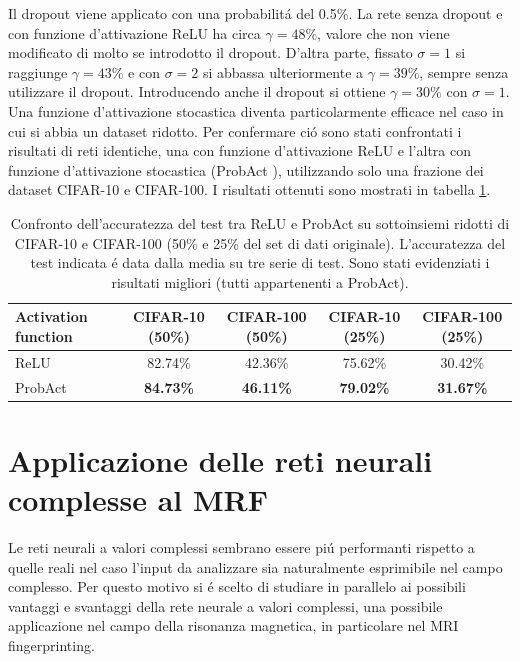 \documentclass[a4paper,10pt]{article}
\begin{document}
  
  Il dropout viene applicato con una probabilit\'a del 0.5\%. La rete senza dropout e con funzione d'attivazione ReLU ha circa $\gamma = 48\%$, valore che non viene modificato di molto se introdotto il dropout. D'altra parte, fissato $\sigma = 1$ si raggiunge $\gamma = 43\%$ e con $\sigma = 2$ si abbassa ulteriormente a $\gamma = 39\%$, sempre senza utilizzare il dropout. Introducendo anche il dropout si ottiene $\gamma = 30\%$ con $\sigma = 1$.
  Una funzione d'attivazione stocastica diventa particolarmente efficace nel caso in cui si abbia un dataset ridotto. Per confermare ci\'o sono stati confrontati i risultati di reti identiche, una con funzione d'attivazione ReLU e l'altra con funzione d'attivazione stocastica (ProbAct \cite{lee2019probact}), utilizzando solo una frazione dei dataset CIFAR-10 e CIFAR-100. I risultati ottenuti sono mostrati in tabella \ref{PartialDatasetTab}.
  \begin{table}[h]\caption{Confronto dell'accuratezza del test tra ReLU e ProbAct su sottoinsiemi ridotti di CIFAR-10 e CIFAR-100 (50\% e 25\% del set di dati originale). L'accuratezza del test indicata \'e data dalla media su tre serie di test. Sono stati evidenziati i risultati migliori (tutti appartenenti a ProbAct).} \label{PartialDatasetTab}
   \centering
   \begin{tabular}[h]{|l|c|c|c|c|}
    \hline
    Activation function & CIFAR-10 (50\%) & CIFAR-100 (50\%) & CIFAR-10 (25\%) & CIFAR-100 (25\%) \\ \hline
    ReLU & 82.74\% & 42.36\% & 75.62\% & 30.42\% \\ 
    ProbAct & \textbf{84.73\%} & \textbf{46.11\%} & \textbf{79.02\%} & \textbf{31.67\%} \\ \hline
   \end{tabular}
  \end{table}
 
 \section{Applicazione delle reti neurali complesse al MRF}\label{MRIsection}
 
 Le reti neurali a valori complessi sembrano essere pi\'u performanti rispetto a quelle reali nel caso l'input da analizzare sia naturalmente esprimibile nel campo complesso. Per questo motivo si \'e scelto di studiare in parallelo ai possibili vantaggi e svantaggi della rete neurale a valori complessi, una possibile applicazione nel campo della risonanza magnetica, in particolare nel MRI fingerprinting. 
 
\end{document}
